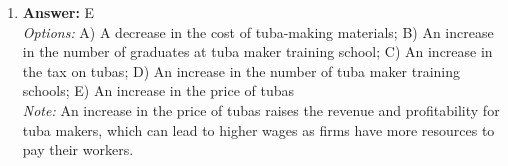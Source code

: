 \documentclass[12pt]{article}
\begin{document}
\begin{enumerate}[label=\arabic*.]
\\ \textit{Note:} The Harrod-Domar model, in conjunction with the Keynesian theory of savings, suggests that the growth rates of economies are determined by the level of investment and the capital-output ratio, implying that both rich and poor countries will converge to similar growth rates irrespective of their differing savings rates.
\item \textbf{Answer:} E
\\ \textit{Options:} A) A decrease in the cost of tuba-making materials; B) An increase in the number of graduates at tuba maker training school; C) An increase in the tax on tubas; D) An increase in the number of tuba maker training schools; E) An increase in the price of tubas
\\ \textit{Note:} An increase in the price of tubas raises the revenue and profitability for tuba makers, which can lead to higher wages as firms have more resources to pay their workers.
\end{enumerate}
\end{document}
